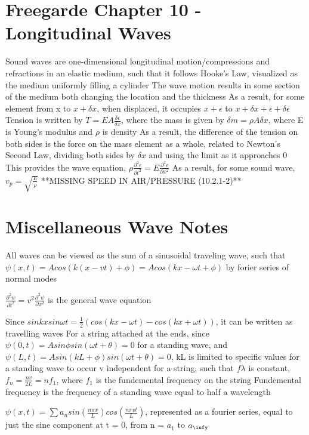 \documentclass[11 pt, twoside]{article}
\newenvironment{outline*}
{
	\begin{outline}[enumerate]
	}
	{\end{outline}
}
\begin{document}
\section{Freegarde Chapter 10 - Longitudinal Waves}
\begin{outline*}
\1 Sound waves are one-dimensional longitudinal motion/compressions and refractions in an elastic medium, such that it follows Hooke's Law, visualized as the medium uniformly filling a cylinder
\2 The wave motion results in some section of the medium both changing the location and the thickness
\2 As a result, for some element from x to $x + \delta x$, when displaced, it occupies $x + \epsilon$ to $x + \delta x + \epsilon + \delta\epsilon$
\3 Tension is written by $T = EA\frac{\delta\epsilon}{\delta x}$, where the mass is given by $\delta m = \rho A \delta x$, where E is Young's modulus and $\rho$ is density
\3 As a result, the difference of the tension on both sides is the force on the mass element as a whole, related to Newton's Second Law, dividing both sides by $\delta x$ and using the limit as it approaches 0
\3 This provides the wave equation, $\rho\frac{\partial^2 \epsilon}{\partial t^2} = E\frac{\partial^2 \epsilon}{\partial x^2}$
\2 As a result, for some sound wave, $v_p = \sqrt{\frac{E}{\rho}}$
\1 **MISSING SPEED IN AIR/PRESSURE (10.2.1-2)**
\end{outline*}
\section{Miscellaneous Wave Notes}
All waves can be viewed as the sum of a sinusoidal traveling wave, such that $\psi(x, t) = Acos(k(x-vt) + \phi) = Acos(kx - \omega t + \phi)$ by forier series of normal modes

$\frac{\partial^2 \psi}{\partial t^2} = v^2\frac{\partial^2 \psi}{\partial x^2}$ is the general wave equation

Since $sinkxsin\omega t = \frac{1}{2}(cos(kx - \omega t) - cos(kx + \omega t))$, it can be written as travelling waves
For a string attached at the ends, since $\psi(0, t) = Asin\phi sin(\omega t + \theta) = 0$ for a standing wave, and $\psi(L, t) = Asin(kL + \phi)sin(\omega t + \theta) = 0$, kL is limited to specific values for a standing wave to occur
v independent for a string, such that $f\lambda$ is constant, $f_n = \frac{nv}{2L} = nf_1$, where $f_1$ is the fundemental frequency on the string
Fundemental frequency is the frequency of a standing wave equal to half a wavelength

$\psi(x, t) = \sum a_n sin(\frac{n\pi x}{L})cos(\frac{n\pi vt}{L})$, represented as a fourier series, equal to just the sine component at t = 0, from n = $a_1$ to $a_\infy$
\end{document}
